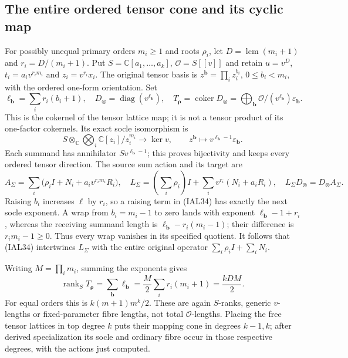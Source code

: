 \documentclass[11pt,a4paper]{article}
\theoremstyle{definition}
\begin{document}
\subsection{The entire ordered tensor cone and its cyclic map}
For possibly unequal primary orders $m_i\geq1$ and roots $\rho_i$,
let $D=\operatorname{lcm}(m_i+1)$ and $r_i=D/(m_i+1)$.  Put
$S=\mathbb C[a_1,\ldots,a_k]$, $\mathcal O=S[[v]]$ and retain
$u=v^D$, $t_i=a_i v^{r_i m_i}$ and $z_i=v^{r_i}x_i$.
The original tensor basis is $z^{\mathbf b}=\prod_i z_i^{b_i}$,
$0\leq b_i<m_i$, with the ordered one-form orientation.  Set
\begin{equation}
 \ell_{\mathbf b}=\sum_i r_i(b_i+1),\quad
 D_{\otimes}=\operatorname{diag}(v^{\ell_{\mathbf b}}),\quad
 T_{\boldsymbol\rho}=\operatorname{coker}D_{\otimes}
   =\bigoplus_{\mathbf b}\mathcal O/(v^{\ell_{\mathbf b}})
                          \varepsilon_{\mathbf b}.   \tag{IAL33}
\end{equation}
This is the cokernel of the tensor lattice map; it is not a tensor
product of its one-factor cokernels.  Its exact socle isomorphism is
\begin{equation}
 S\otimes_{\mathbb C}\bigotimes_i\mathbb C[z_i]/z_i^{m_i}
 \longrightarrow\ker v,\qquad
 z^{\mathbf b}\longmapsto
       v^{\ell_{\mathbf b}-1}\varepsilon_{\mathbf b}.
                                                        \tag{IAL34}
\end{equation}
Each summand has annihilator $S v^{\ell_{\mathbf b}-1}$; this proves
bijectivity and keeps every ordered tensor direction.  The source
sum action and its target are
\begin{equation}
 A_{\Sigma}=\sum_i\bigl(\rho_i I+N_i+a_i v^{r_i m_i}R_i\bigr),
 \quad L_{\Sigma}=\left(\sum_i\rho_i\right)I
                     +\sum_i v^{r_i}(N_i+a_iR_i),
 \quad L_{\Sigma}D_{\otimes}=D_{\otimes}A_{\Sigma}.
                                                        \tag{IAL35}
\end{equation}
Raising $b_i$ increases $\ell$ by $r_i$, so a raising term in (IAL34)
has exactly the next socle exponent.  A wrap from $b_i=m_i-1$ to zero
lands with exponent $\ell_{\mathbf b}-1+r_i$, whereas the receiving
summand length is $\ell_{\mathbf b}-r_i(m_i-1)$; their difference is
$r_i m_i-1\geq0$.  Thus every wrap vanishes in its specified quotient.
It follows that (IAL34) intertwines $L_{\Sigma}$ with the entire
original operator $\sum_i\rho_i I+\sum_iN_i$.

Writing $M=\prod_i m_i$, summing the exponents gives
\begin{equation}
 \operatorname{rank}_S T_{\boldsymbol\rho}
 =\sum_{\mathbf b}\ell_{\mathbf b}
 =\frac M2\sum_i r_i(m_i+1)=\frac{kDM}{2}.             \tag{IAL36}
\end{equation}
For equal orders this is $k(m+1)m^k/2$.  These are again $S$-ranks,
generic $v$-lengths or fixed-parameter fibre lengths, not total
$\mathcal O$-lengths.  Placing the free tensor lattices in top degree
$k$ puts their mapping cone in degrees $k-1,k$; after derived
specialization its socle and ordinary fibre occur in those respective
degrees, with the actions just computed.
\end{document}
